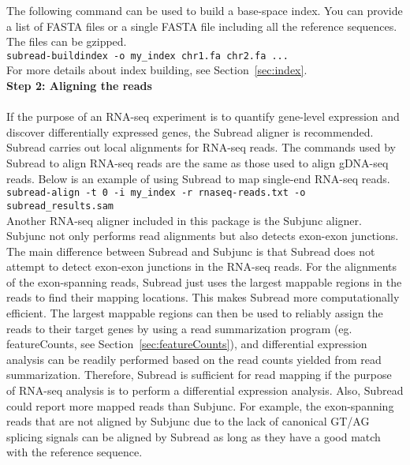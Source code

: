 \documentclass[12pt]{report}
\newcommand{\code}[1]{{\small\texttt{#1}}}
\newcommand{\Subread}{\textsf{Subread}}
\newcommand{\Subjunc}{\textsf{Subjunc}}
\newcommand{\featureCounts}{\textsf{featureCounts}}
\begin{document}
\noindent The following command can be used to build a base-space index.
You can provide a list of FASTA files or a single FASTA file including all the reference sequences.
The files can be gzipped.\\

\code{subread-buildindex -o my\_index chr1.fa chr2.fa ...}\\

\noindent For more details about index building, see Section~\ref{sec:index}.\\

{\noindent\bf Step 2: Aligning the reads}\\

\noindent{{\Subread}}\\

\noindent If the purpose of an RNA-seq experiment is to quantify gene-level expression and discover differentially expressed genes, the {\Subread} aligner is recommended.
{\Subread} carries out local alignments for RNA-seq reads.
The commands used by {\Subread} to align RNA-seq reads are the same as those used to align gDNA-seq reads.
Below is an example of using {\Subread} to map single-end RNA-seq reads.\\

\code{subread-align -t 0 -i my\_index -r rnaseq-reads.txt -o subread\_results.sam}\\

\noindent Another RNA-seq aligner included in this package is the {\Subjunc} aligner.
{\Subjunc} not only performs read alignments but also detects exon-exon junctions.
The main difference between {\Subread} and {\Subjunc} is that {\Subread} does not attempt to detect exon-exon junctions in the RNA-seq reads.
For the alignments of the exon-spanning reads, {\Subread} just uses the largest mappable regions in the reads to find their mapping locations.
This makes {\Subread} more computationally efficient.
The largest mappable regions can then be used to reliably assign the reads to their target genes by using a read summarization program (eg. \featureCounts, see Section~\ref{sec:featureCounts}), and differential expression analysis can be readily performed based on the read counts yielded from read summarization.
Therefore, {\Subread} is sufficient for read mapping if the purpose of RNA-seq analysis is to perform a differential expression analysis. 
Also, {\Subread} could report more mapped reads than {\Subjunc}.
For example, the exon-spanning reads that are not aligned by {\Subjunc} due to the lack of canonical GT/AG splicing signals can be aligned by {\Subread} as long as they have a good match with the reference sequence.\\
\end{document}
